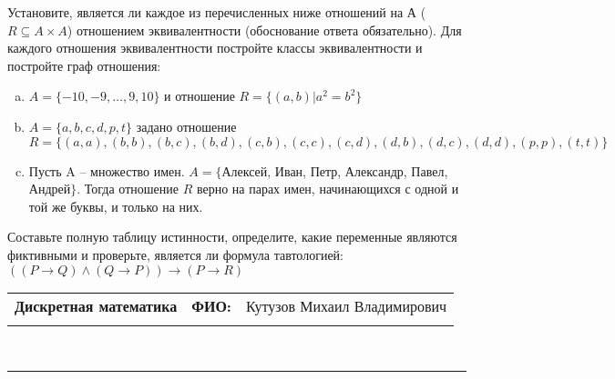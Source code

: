 \documentclass[10pt]{exam}
\newcommand{\class}{Дискретная математика}
\newcommand{\examdate}{}
\begin{document}
\begin{questions}
\question
Установите, является ли каждое из перечисленных ниже отношений на А ($R \subseteq A \times A$) отношением эквивалентности (обоснование ответа обязательно). Для каждого отношения эквивалентности постройте классы 
эквивалентности и постройте граф отношения:
\begin{enumerate} [a)]\setcounter{enumi}{0}
\item $A = \{-10, -9, … , 9, 10\}$ и отношение $R = \{(a,b)|a^{2} = b^{2}\}$
\item $A = \{a, b, c, d, p, t\}$ задано отношение $R = \{(a, a), (b, b), (b, c), (b, d), (c, b), (c, c), (c, d), (d, b), (d, c), (d, d), (p,p), (t,t)\}$
\item Пусть A – множество имен. $A = \{ $Алексей, Иван, Петр, Александр, Павел, Андрей$ \}$. Тогда отношение $R$ верно на парах имен, начинающихся с одной и той же буквы, и только на них.
\end{enumerate}\question Составьте полную таблицу истинности, определите, какие переменные являются фиктивными и проверьте, является ли формула тавтологией:
$(( P \rightarrow Q) \land (Q \rightarrow P)) \rightarrow (P \rightarrow R)$

\end{questions}
\newpage
\begin{flushright}
\begin{tabular}{p{2.8in} r l}
\textbf{\class} & \textbf{ФИО:} &Кутузов Михаил Владимирович
\\

\textbf{\examdate} &&\\
\end{tabular}\\
\end{flushright}
\rule[1ex]{\textwidth}{.1pt}
\end{document}
